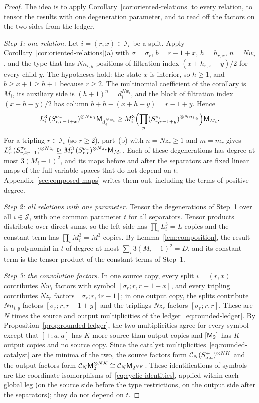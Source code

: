 \begin{proof}
The idea is to apply Corollary~\ref{cor:oriented-relations} to every
relation, to tensor the results with one degeneration parameter, and to
read off the factors on the two sides from the ledger.

\emph{Step 1: one relation.} Let \(i=(r,x)\in\mathcal I_c\) be a split. Apply
Corollary~\ref{cor:oriented-relations}(a) with \(\sigma=\sigma_r\),
\(b=r-1+x\), \(h=h_{r,x}\), \(n=Nw_i\), and the type that has \(Nn_{i,y}\)
positions of filtration index \((x+h_{r,x}-y)/2\) for every child \(y\).
The hypotheses hold: the state \(x\) is interior, so \(h\ge1\), and
\(b\ge x+1\ge h+1\) because \(r\ge2\). The multinomial coefficient of the
corollary is \(M_i\), its auxiliary side is \((h+1)^n=d_i^{Nw_i}\), and the
block of filtration index \((x+h-y)/2\) has column \(b+h-(x+h-y)=r-1+y\).
Hence
\[
 L_i^3\,(S^{\sigma_r}_{r,r-1+x})^{\otimes Nw_i}\mathsf M_{d_i^{Nw_i}}
 \unrhd M_i^3\Bigl(\prod_y(S^{\sigma_r}_{r,r-1+y})^{\otimes Nn_{i,y}}\Bigr)
 \mathsf M_{M_i}.
\]
For a tripling \(r\in\mathcal I_t\) (so \(r\ge2\)), part~(b) with \(n=Nz_r\ge1\) and
\(m=m_r\) gives
\(L_r^3\,(S^{\sigma_r}_{r,4r-1})^{\otimes Nz_r}\unrhd
M_r^3\,(S^{\sigma_r}_{r,r})^{\otimes Nz_r}\mathsf M_{M_r}\). Each of these
degenerations has degree at most \(3(M_i-1)^2\), and its maps before and
after the separators are fixed linear maps of the full variable spaces that
do not depend on \(t\); Appendix~\ref{sec:composed-maps} writes them out,
including the terms of positive degree.

\emph{Step 2: all relations with one parameter.} Tensor the degenerations
of Step~1 over all \(i\in\mathcal J\), with one common parameter \(t\) for
all separators. Tensor products distribute over direct sums, so the left
side has \(\prod_iL_i^3=L\) copies and the constant term has
\(\prod_iM_i^3=M^3\) copies. By Lemma~\ref{lem:composition}, the result
is a polynomial in \(t\) of degree at most \(\sum_i3(M_i-1)^2=D\), and its
constant term is the tensor product of the constant terms of Step~1.

\emph{Step 3: the convolution factors.} In one source copy, every split
\(i=(r,x)\) contributes \(Nw_i\) factors with symbol
\([\sigma_r;r,r-1+x]\), and every tripling contributes \(Nz_r\) factors
\([\sigma_r;r,4r-1]\); in one output copy, the splits contribute
\(Nn_{i,y}\) factors \([\sigma_r;r,r-1+y]\) and the triplings \(Nz_r\)
factors \([\sigma_r;r,r]\). These are \(N\) times the source and output
multiplicities of the ledger~\eqref{eq:rounded-ledger}. By
Proposition~\ref{prop:rounded-ledger}, the two multiplicities agree for
every symbol except that \([+;a,a]\) has \(K\) more source than output
copies and \([\mathsf M_2]\) has \(K\) output copies and no source copy. Since
the catalyst multiplicities~\eqref{eq:rounded-catalyst} are the minima of
the two, the source factors form \(\mathcal C_N(S^+_{a,a})^{\otimes NK}\) and the
output factors form \(\mathcal C_N\mathsf M_2^{\otimes NK}\cong\mathcal C_N\mathsf M_{2^{NK}}\).
These identifications of symbols are the coordinate isomorphisms
of~\eqref{eq:cyclic-identities}, applied within each global leg (on the
source side before the type restrictions, on the output side after the
separators); they do not depend on \(t\).


\end{proof}
